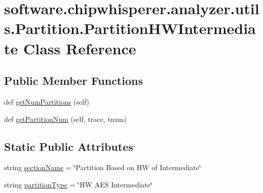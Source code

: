 \hypertarget{classsoftware_1_1chipwhisperer_1_1analyzer_1_1utils_1_1Partition_1_1PartitionHWIntermediate}{}\section{software.\+chipwhisperer.\+analyzer.\+utils.\+Partition.\+Partition\+H\+W\+Intermediate Class Reference}
\label{classsoftware_1_1chipwhisperer_1_1analyzer_1_1utils_1_1Partition_1_1PartitionHWIntermediate}
\subsection*{Public Member Functions}
\begin{DoxyCompactItemize}
\item 
def \hyperlink{classsoftware_1_1chipwhisperer_1_1analyzer_1_1utils_1_1Partition_1_1PartitionHWIntermediate_a190babe4603b3d305c80f9cbcd12b002}{get\+Num\+Partitions} (self)
\item 
def \hyperlink{classsoftware_1_1chipwhisperer_1_1analyzer_1_1utils_1_1Partition_1_1PartitionHWIntermediate_a7fdfcecdae86b4ba7dd96b0db4117a0a}{get\+Partition\+Num} (self, trace, tnum)
\end{DoxyCompactItemize}
\subsection*{Static Public Attributes}
\begin{DoxyCompactItemize}
\item 
string \hyperlink{classsoftware_1_1chipwhisperer_1_1analyzer_1_1utils_1_1Partition_1_1PartitionHWIntermediate_a2d76aa327194477fd5fedfb325696a37}{section\+Name} = \char`\"{}Partition Based on H\+W of Intermediate\char`\"{}
\item 
string \hyperlink{classsoftware_1_1chipwhisperer_1_1analyzer_1_1utils_1_1Partition_1_1PartitionHWIntermediate_ab3685355df59fcf1290498fe18e39afc}{partition\+Type} = \char`\"{}H\+W A\+E\+S Intermediate\char`\"{}
\end{DoxyCompactItemize}


